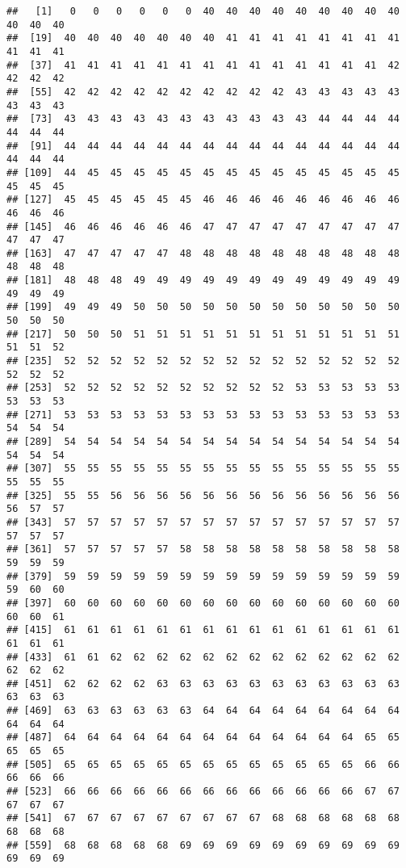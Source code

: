 \documentclass[
  10pt,
  spanish,
]{article}
\begin{document}
\begin{verbatim}
##   [1]   0   0   0   0   0   0  40  40  40  40  40  40  40  40  40  40  40  40
##  [19]  40  40  40  40  40  40  40  41  41  41  41  41  41  41  41  41  41  41
##  [37]  41  41  41  41  41  41  41  41  41  41  41  41  41  41  42  42  42  42
##  [55]  42  42  42  42  42  42  42  42  42  42  43  43  43  43  43  43  43  43
##  [73]  43  43  43  43  43  43  43  43  43  43  43  44  44  44  44  44  44  44
##  [91]  44  44  44  44  44  44  44  44  44  44  44  44  44  44  44  44  44  44
## [109]  44  45  45  45  45  45  45  45  45  45  45  45  45  45  45  45  45  45
## [127]  45  45  45  45  45  45  46  46  46  46  46  46  46  46  46  46  46  46
## [145]  46  46  46  46  46  46  47  47  47  47  47  47  47  47  47  47  47  47
## [163]  47  47  47  47  47  48  48  48  48  48  48  48  48  48  48  48  48  48
## [181]  48  48  48  49  49  49  49  49  49  49  49  49  49  49  49  49  49  49
## [199]  49  49  49  50  50  50  50  50  50  50  50  50  50  50  50  50  50  50
## [217]  50  50  50  51  51  51  51  51  51  51  51  51  51  51  51  51  51  52
## [235]  52  52  52  52  52  52  52  52  52  52  52  52  52  52  52  52  52  52
## [253]  52  52  52  52  52  52  52  52  52  52  53  53  53  53  53  53  53  53
## [271]  53  53  53  53  53  53  53  53  53  53  53  53  53  53  53  54  54  54
## [289]  54  54  54  54  54  54  54  54  54  54  54  54  54  54  54  54  54  54
## [307]  55  55  55  55  55  55  55  55  55  55  55  55  55  55  55  55  55  55
## [325]  55  55  56  56  56  56  56  56  56  56  56  56  56  56  56  56  57  57
## [343]  57  57  57  57  57  57  57  57  57  57  57  57  57  57  57  57  57  57
## [361]  57  57  57  57  57  58  58  58  58  58  58  58  58  58  58  59  59  59
## [379]  59  59  59  59  59  59  59  59  59  59  59  59  59  59  59  59  60  60
## [397]  60  60  60  60  60  60  60  60  60  60  60  60  60  60  60  60  60  61
## [415]  61  61  61  61  61  61  61  61  61  61  61  61  61  61  61  61  61  61
## [433]  61  61  62  62  62  62  62  62  62  62  62  62  62  62  62  62  62  62
## [451]  62  62  62  62  63  63  63  63  63  63  63  63  63  63  63  63  63  63
## [469]  63  63  63  63  63  63  64  64  64  64  64  64  64  64  64  64  64  64
## [487]  64  64  64  64  64  64  64  64  64  64  64  64  64  65  65  65  65  65
## [505]  65  65  65  65  65  65  65  65  65  65  65  65  65  66  66  66  66  66
## [523]  66  66  66  66  66  66  66  66  66  66  66  66  66  67  67  67  67  67
## [541]  67  67  67  67  67  67  67  67  67  68  68  68  68  68  68  68  68  68
## [559]  68  68  68  68  68  69  69  69  69  69  69  69  69  69  69  69  69  69

\end{verbatim}
\end{document}

